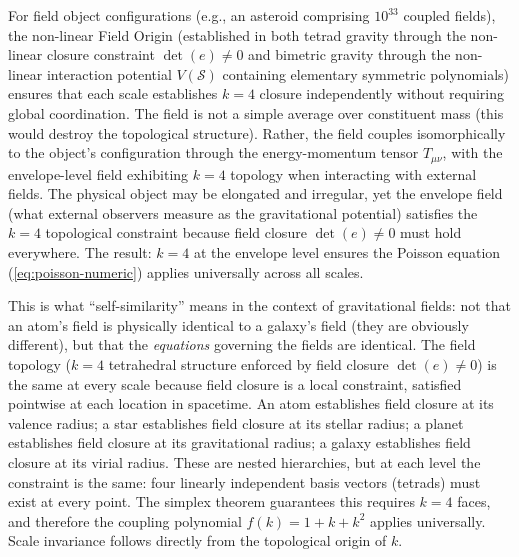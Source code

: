 \documentclass[aps,prd,preprint,superscriptaddress,showpacs,preprintnumbers,amsmath,amssymb,nofootinbib]{revtex4-2}
\begin{document}
For field object configurations (e.g., an asteroid comprising $10^{33}$ coupled fields), the non-linear Field Origin (established in both tetrad gravity through the non-linear closure constraint $\det(e) \neq 0$ and bimetric gravity through the non-linear interaction potential $V(\mathcal{S})$ containing elementary symmetric polynomials) ensures that each scale establishes $k=4$ closure independently without requiring global coordination. The field is not a simple average over constituent mass (this would destroy the topological structure). Rather, the field couples isomorphically to the object's configuration through the energy-momentum tensor $T_{\mu\nu}$, with the envelope-level field exhibiting $k=4$ topology when interacting with external fields. The physical object may be elongated and irregular, yet the envelope field (what external observers measure as the gravitational potential) satisfies the $k=4$ topological constraint because field closure $\det(e) \neq 0$ must hold everywhere. The result: $k=4$ at the envelope level ensures the Poisson equation (\ref{eq:poisson-numeric}) applies universally across all scales.


This is what ``self-similarity'' means in the context of gravitational fields: not that an atom's field is physically identical to a galaxy's field (they are obviously different), but that the \emph{equations} governing the fields are identical. The field topology ($k=4$ tetrahedral structure enforced by field closure $\det(e) \neq 0$) is the same at every scale because field closure is a local constraint, satisfied pointwise at each location in spacetime. An atom establishes field closure at its valence radius; a star establishes field closure at its stellar radius; a planet establishes field closure at its gravitational radius; a galaxy establishes field closure at its virial radius. These are nested hierarchies, but at each level the constraint is the same: four linearly independent basis vectors (tetrads) must exist at every point. The simplex theorem guarantees this requires $k=4$ faces, and therefore the coupling polynomial $f(k) = 1 + k + k^2$ applies universally. Scale invariance follows directly from the topological origin of $k$.
\end{document}
